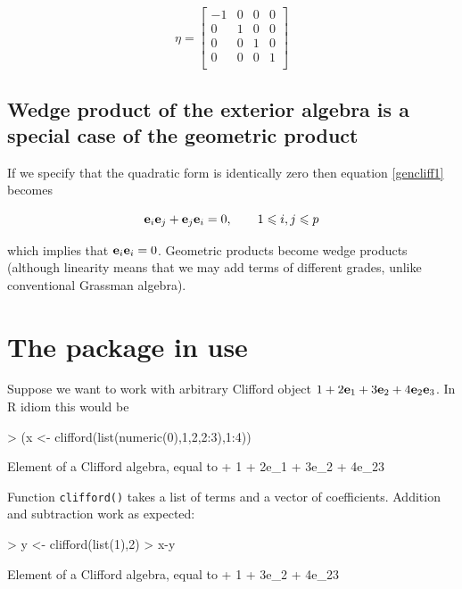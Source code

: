 \documentclass{article}
\begin{document}
\begin{equation}\eta=
  \begin{bmatrix}
    -1&0&0&0\\
    0&1&0&0\\
    0&0&1&0\\
    0&0&0&1\\
  \end{bmatrix}
\end{equation}


\subsection{Wedge product of the exterior algebra is a special case
  of the geometric product}

If we specify that the quadratic form is identically zero then
equation \ref{gencliff1} becomes

\begin{equation}\label{specwedge}
{\bf e}_{i}{\bf e}_{j}+{\bf e}_{j}{\bf e}_{i}=0,\qquad 1\leqslant i,j\leqslant p
\end{equation}

which implies that ${\bf e}_{i}{\bf e}_{i}=0$.  Geometric products become wedge
products (although linearity means that we may add terms of different
grades, unlike conventional Grassman algebra).

\section{The package in use}

Suppose we want to work with arbitrary Clifford object
$1+2{\bf e}_{1}+3{\bf e}_{2}+4{\bf e}_{2}{\bf e}_{3}$.  In R idiom this would be

\begin{Schunk}
\begin{Sinput}
> (x <- clifford(list(numeric(0),1,2,2:3),1:4))
\end{Sinput}
\begin{Soutput}
Element of a Clifford algebra, equal to
+ 1 + 2e_1 + 3e_2 + 4e_23
\end{Soutput}
\end{Schunk}

Function {\tt clifford()} takes a list of terms and a vector of
coefficients.  Addition and subtraction work as expected:

\begin{Schunk}
\begin{Sinput}
> y <- clifford(list(1),2)
> x-y
\end{Sinput}
\begin{Soutput}
Element of a Clifford algebra, equal to
+ 1 + 3e_2 + 4e_23
\end{Soutput}
\end{Schunk}
\end{document}
